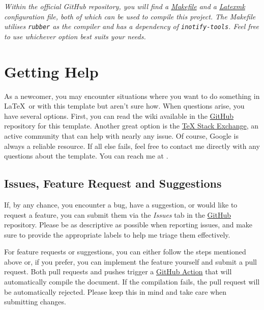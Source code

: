 {\begin{block}[tip]
\textit{Within the official GitHub repository, you will find a \href{https://github.com/joseareia/ipleiria-thesis/blob/master/Makefile}{Makefile} and a \href{https://github.com/joseareia/ipleiria-thesis/blob/master/.latexmkrc}{Latexmk} configuration file, both of which can be used to compile this project. The Makefile utilises \texttt{rubber} as the compiler and has a dependency of \texttt{inotify-tools}. Feel free to use whichever option best suits your needs.}
\end{block}

\section{Getting Help}
As a newcomer, you may encounter situations where you want to do something in \LaTeX~or with this template but aren't sure how. When questions arise, you have several options. First, you can read the wiki available in the \href{https://github.com/joseareia/ipleiria-thesis}{GitHub} repository for this template. Another great option is the \href{https://tex.stackexchange.com/}{TeX Stack Exchange}, an active community that can help with nearly any issue. Of course, Google is always a reliable resource. If all else fails, feel free to contact me directly with any questions about the template. You can reach me at \textit{\textcolor{blue}{}}.

\subsection{Issues, Feature Request and Suggestions}
If, by any chance, you encounter a bug, have a suggestion, or would like to request a feature, you can submit them via the \textit{Issues} tab in the \href{https://github.com/joseareia/ipleiria-thesis}{GitHub} repository. Please be as descriptive as possible when reporting issues, and make sure to provide the appropriate labels to help me triage them effectively.

For feature requests or suggestions, you can either follow the steps mentioned above or, if you prefer, you can implement the feature yourself and submit a pull request. Both pull requests and pushes trigger a \href{https://github.com/joseareia/ipleiria-thesis/actions/workflows/latex.yml}{GitHub Action} that will automatically compile the document. If the compilation fails, the pull request will be automatically rejected. Please keep this in mind and take care when submitting changes.

}
